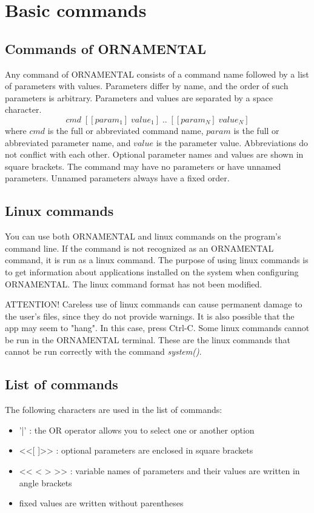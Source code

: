 \documentclass[a4paper]{article}
\begin{document}
\section{Basic commands} 
\subsection{Commands of ORNAMENTAL}
Any command of ORNAMENTAL consists of a command name followed by a list of parameters with values. Parameters differ by name, and the order of such parameters is arbitrary. Parameters and values are separated by a space character. 
\[
cmd \; [[param_1]\;value_1]\;..\;[[param_N]\;value_N]
\]
where $cmd$ is the full or abbreviated command name, $param$ is the full or abbreviated parameter name, and $value$ is the parameter value. Abbreviations do not conflict with each other. Optional parameter names and values are shown in square brackets. The command may have no parameters or have unnamed parameters. Unnamed parameters always have a fixed order. 

\subsection{Linux commands}
You can use both ORNAMENTAL and linux commands on the program's command line. If the command is not recognized as an ORNAMENTAL command, it is run as a linux command. The purpose of using linux commands is to get information about applications installed on the system when configuring ORNAMENTAL. The linux command format has not been modified.

ATTENTION! Careless use of linux commands can cause permanent damage to the user's files, since they do not provide warnings. It is also possible that the app may seem to "hang". In this case, press Ctrl-C. Some linux commands cannot be run in the ORNAMENTAL terminal. These are the linux commands that cannot be run correctly with the command \textit{system()}.

\subsection{List of commands}

The following characters are used in the list of commands:
\begin{itemize}
\item '|' : the OR operator allows you to select one or another option
\item <<[ ]>> : optional parameters are enclosed in square brackets 
\item << < > >> : variable names of parameters and their values are written in angle brackets
\item fixed values are written without parentheses
\end{itemize}
    
\end{document}
